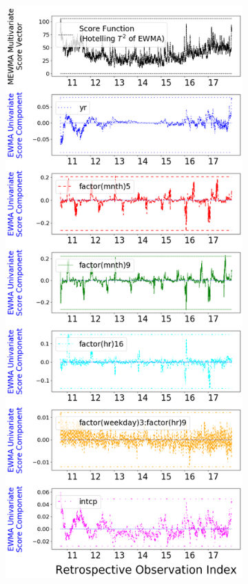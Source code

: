 \documentclass[twoside,11pt]{article}
\begin{document}
\begin{figure}[H]
\centering
    \begin{subfigure}[t]{0.4\linewidth}
     \centering
         \includegraphics[width=1.0\textwidth, trim=.0in .0in .0in .0in, clip]{../figures/v14/bike_sharing/reg_lin_A/PII_neg_single_retro_bike_fisher_mlines_with_regu_1e-08_0_0001_0_01_99_99.png}

\end{subfigure}
\end{figure}
\end{document}
